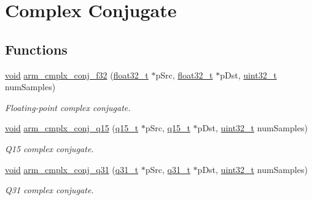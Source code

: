 \hypertarget{group__cmplx__conj}{\section{Complex Conjugate}
\label{group__cmplx__conj}
}
\subsection*{Functions}
\begin{DoxyCompactItemize}
\item 
\hyperlink{group___n_a_m_e_ga18028b8badbf1ea7e704ccac3c488e82}{void} \hyperlink{group__cmplx__conj_ga3a102aead6460ad9fcb0626f6b226ffb}{arm\-\_\-cmplx\-\_\-conj\-\_\-f32} (\hyperlink{arm__math_8h_a4611b605e45ab401f02cab15c5e38715}{float32\-\_\-t} $\ast$p\-Src, \hyperlink{arm__math_8h_a4611b605e45ab401f02cab15c5e38715}{float32\-\_\-t} $\ast$p\-Dst, \hyperlink{stdint_8h_a435d1572bf3f880d55459d9805097f62}{uint32\-\_\-t} num\-Samples)
\begin{DoxyCompactList}\small\item\em Floating-\/point complex conjugate. \end{DoxyCompactList}\item 
\hyperlink{group___n_a_m_e_ga18028b8badbf1ea7e704ccac3c488e82}{void} \hyperlink{group__cmplx__conj_gaf47689ae07962acaecb8ddde556df4a4}{arm\-\_\-cmplx\-\_\-conj\-\_\-q15} (\hyperlink{arm__math_8h_ab5a8fb21a5b3b983d5f54f31614052ea}{q15\-\_\-t} $\ast$p\-Src, \hyperlink{arm__math_8h_ab5a8fb21a5b3b983d5f54f31614052ea}{q15\-\_\-t} $\ast$p\-Dst, \hyperlink{stdint_8h_a435d1572bf3f880d55459d9805097f62}{uint32\-\_\-t} num\-Samples)
\begin{DoxyCompactList}\small\item\em Q15 complex conjugate. \end{DoxyCompactList}\item 
\hyperlink{group___n_a_m_e_ga18028b8badbf1ea7e704ccac3c488e82}{void} \hyperlink{group__cmplx__conj_gafecc94879a383c5208ec3ef99485e4b5}{arm\-\_\-cmplx\-\_\-conj\-\_\-q31} (\hyperlink{arm__math_8h_adc89a3547f5324b7b3b95adec3806bc0}{q31\-\_\-t} $\ast$p\-Src, \hyperlink{arm__math_8h_adc89a3547f5324b7b3b95adec3806bc0}{q31\-\_\-t} $\ast$p\-Dst, \hyperlink{stdint_8h_a435d1572bf3f880d55459d9805097f62}{uint32\-\_\-t} num\-Samples)
\begin{DoxyCompactList}\small\item\em Q31 complex conjugate. \end{DoxyCompactList}\end{DoxyCompactItemize}


